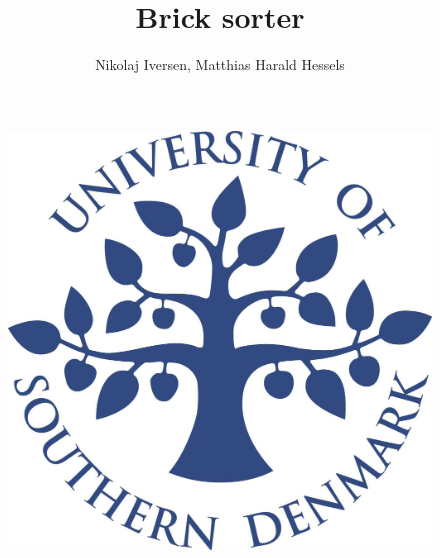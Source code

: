 \documentclass[a4paper,10pt]{article}
\title{Brick sorter}
\author{Nikolaj Iversen, Matthias Harald Hessels}
\begin{document}
\maketitle
\vspace{2 cm}
\begin{figure}[h]
\centering
\includegraphics{img/sdu.jpg}
\end{figure}
\thispagestyle{empty}
\addtocounter{page}{-1}
\newpage 

\tableofcontents
\listoftodos
\thispagestyle{empty}
\addtocounter{page}{-1}
\newpage





\newpage



\newpage
\end{document}
